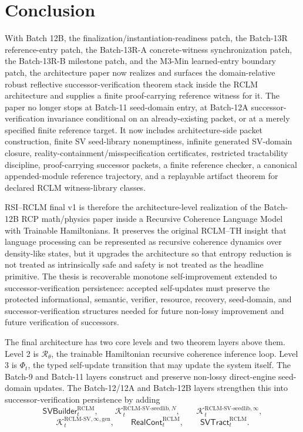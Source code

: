 \documentclass[11pt,a4paper]{article}
\newcommand{\Kcal}{\mathcal K}
\newcommand{\Rcal}{\mathcal R}
\newcommand{\RCLM}{\mathrm{RCLM}}
\begin{document}
\section{Conclusion}

With Batch 12B, the finalization/instantiation-readiness patch, the Batch-13R reference-entry patch, the Batch-13R-A concrete-witness synchronization patch, the Batch-13R-B milestone patch, and the M3-Min learned-entry boundary patch, the architecture paper now realizes and surfaces the domain-relative robust reflective successor-verification theorem stack inside the RCLM architecture and supplies a finite proof-carrying reference witness for it.  The paper no longer stops at Batch-11 seed-domain entry, at Batch-12A successor-verification invariance conditional on an already-existing packet, or at a merely specified finite reference target.  It now includes architecture-side packet construction, finite SV seed-library nonemptiness, infinite generated SV-domain closure, reality-containment/misspecification certificates, restricted tractability discipline, proof-carrying successor packets, a finite reference checker, a canonical appended-module reference trajectory, and a replayable artifact theorem for declared RCLM witness-library classes.

RSI--RCLM final v1 is therefore the architecture-level realization of the Batch-12B RCP math/physics paper inside a Recursive Coherence Language Model with Trainable Hamiltonians.  It preserves the original RCLM--TH insight that language processing can be represented as recursive coherence dynamics over density-like states, but it upgrades the architecture so that entropy reduction is not treated as intrinsically safe and safety is not treated as the headline primitive.  The thesis is recoverable monotone self-improvement extended to successor-verification persistence: accepted self-updates must preserve the protected informational, semantic, verifier, resource, recovery, seed-domain, and successor-verification structures needed for future non-lossy improvement and future verification of successors.

The final architecture has two core levels and two theorem layers above them.  Level 2 is \(\Rcal_{\theta}\), the trainable Hamiltonian recursive coherence inference loop.  Level 3 is \(\Phi_t\), the typed self-update transition that may update the system itself.  The Batch-9 and Batch-11 layers construct and preserve non-lossy direct-engine seed-domain updates.  The Batch-12/12A and Batch-12B layers strengthen this into successor-verification persistence by adding
\[
\mathsf{SVBuilder}_t^{\RCLM},
\qquad
\Kcal_t^{\RCLM\text{-}\mathrm{SV\mbox{-}seedlib},N},
\qquad
\Kcal_t^{\RCLM\text{-}\mathrm{SV\mbox{-}seedlib},\infty},
\]
\[
\Kcal_t^{\RCLM\text{-}\mathrm{SV},\infty,\mathrm{gen}},
\qquad
\mathsf{RealCont}_t^{\RCLM},
\qquad
\mathsf{SVTract}_t^{\RCLM}.
\]
\end{document}
